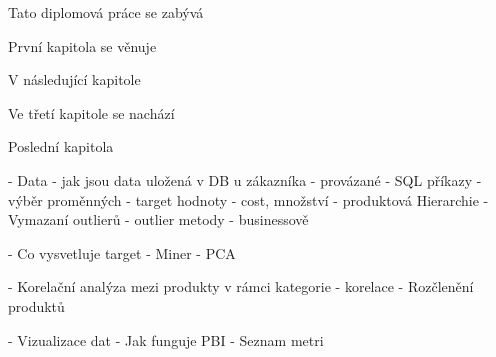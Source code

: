 Tato diplomová práce se zabývá 

První kapitola se věnuje 

V následující kapitole 

Ve třetí kapitole se nachází 

Poslední kapitola 

- Data
    - jak jsou data uložená v DB u zákazníka
        - provázané
    - SQL příkazy
    - výběr proměnných
    - target hodnoty - cost, množství
    - produktová Hierarchie
- Vymazaní outlierů
    - outlier metody
    - businessově

- Co vysvetluje target
    - Miner
    - PCA

- Korelační analýza mezi produkty v rámci kategorie
    - korelace 
- Rozčlenění produktů

- Vizualizace dat
    - Jak funguje PBI
    - Seznam metri